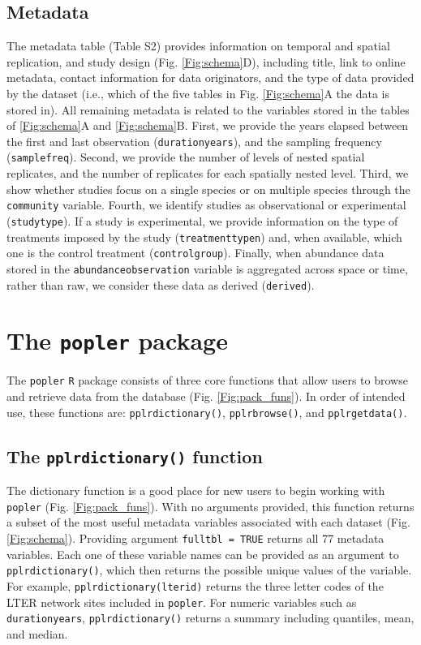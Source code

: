 \documentclass{article}\usepackage[]{graphicx}\usepackage[]{color}
\begin{document}
\subsection*{Metadata}
The metadata table (Table S2) provides information on temporal and spatial replication, and study design (Fig. \ref{Fig:schema}D), including title, link to online metadata, contact information for data originators, and the type of data provided by the dataset (i.e., which of the five tables in Fig. \ref{Fig:schema}A the data is stored in). All remaining metadata is related to the variables stored in the tables of \ref{Fig:schema}A and \ref{Fig:schema}B. First, we provide the years elapsed between the first and last observation (\texttt{duration\textunderscore years}), and the sampling frequency (\texttt{samplefreq}). Second, we provide the number of levels of nested spatial replicates, and the number of replicates for each spatially nested level. Third, we show whether studies focus on a single species or on multiple species through the \texttt{community} variable. Fourth, we identify studies as observational or experimental (\texttt{studytype}). If a study is experimental, we provide information on the type of treatments imposed by the study (\texttt{treatment\textunderscore type\textunderscore n}) and, when available, which one is the control treatment (\texttt{control\textunderscore group}). Finally, when abundance data stored in the \texttt{abundance\textunderscore observation} variable is aggregated across space or time, rather than raw, we consider these data as derived (\texttt{derived}).

\section*{The \texttt{popler} package}
The \texttt{popler} \texttt{R} package consists of three core functions that allow users to browse and retrieve data from the database (Fig. \ref{Fig:pack_funs}). In order of intended use, these functions are: \texttt{pplr\textunderscore dictionary()}, \texttt{pplr\textunderscore browse()}, and \texttt{pplr\textunderscore get\textunderscore data()}.

\subsection*{The \texttt{pplr\textunderscore dictionary()} function}
The dictionary function is a good place for new users to begin working with \texttt{popler} (Fig. \ref{Fig:pack_funs}). With no arguments provided, this function returns a subset of the most useful metadata variables associated with each  dataset (Fig. \ref{Fig:schema}). Providing argument \texttt{full\textunderscore tbl = TRUE} returns all 77 metadata variables. Each one of these variable names can be provided as an argument to \texttt{pplr\textunderscore dictionary()}, which then returns the possible unique values of the variable. For example, \texttt{pplr\textunderscore dictionary(lterid)} returns the three letter codes of the LTER network sites included in \texttt{popler}. For numeric variables such as \texttt{duration\textunderscore years}, \texttt{pplr\textunderscore dictionary()} returns a summary including quantiles, mean, and median. 
\end{document}
